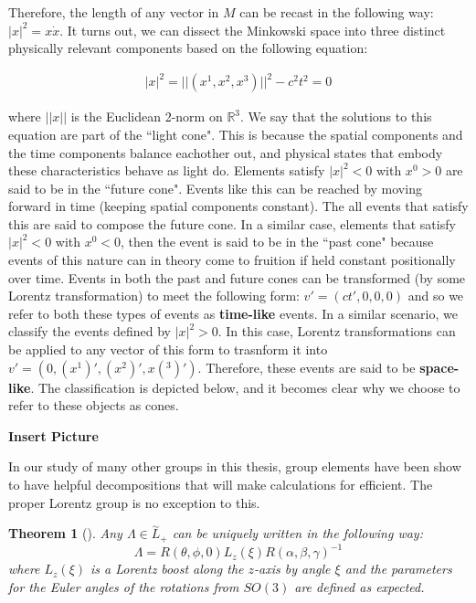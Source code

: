 \documentclass[10pt]{ucthesis}
\newcommand{\R}{\mathbb{R}}
\newtheorem{theorem}[definition]{Theorem}
\begin{document}
Therefore, the length of any vector in $M$ can be recast in the following way: $|x|^2 = x\dot x$. It turns out, we can dissect the Minkowski space into three distinct physically relevant components based on the following equation:

\begin{equation}
\begin{aligned}
	|x|^2 = ||(x^1,x^2,x^3)||^2 - c^2t^2= 0 
\end{aligned}
\end{equation}

\noindent where $||x||$ is the Euclidean 2-norm on $\R^3$. We say that the solutions to this equation are part of the ``light cone". This is because the spatial components and the time components balance eachother out, and physical states that embody these characteristics behave as light do. Elements satisfy $|x|^2 < 0$ with $x^0>0$ are said to be  in the ``future cone". Events like this can be reached by moving forward in time (keeping spatial components constant). The all events that satisfy this are said to compose the future cone. In a similar case, elements that satisfy $|x|^2 < 0$ with $x^0<0$, then the event is said to be in the ``past cone" because events of this nature can in theory come to fruition if held constant positionally over time. Events in both the past and future cones can be transformed (by some Lorentz transformation) to meet the following form: $v' = (ct',0,0,0)$ and so we refer to both these types of events as \textbf{time-like} events. In a similar scenario, we classify the events defined by $|x|^2 >0$. In this case, Lorentz transformations can be applied to any vector of this form to trasnform it into $v' = (0,(x^1)',(x^2)',x(^3)')$. Therefore, these events are said to be \textbf{space-like}. The classification is depicted below, and it becomes clear why we choose to refer to these objects as cones.

\textbf{Insert Picture}

In our study of many other groups in this thesis, group elements have been show to have helpful decompositions that will make calculations for efficient. The proper Lorentz group is no exception to this.

\begin{theorem}[\cite{Tung}]
	Any $\Lambda \in \overset{\sim}{L}_+$ can be uniquely written in the following way:
$$\Lambda = R(\theta,\phi,0)L_z(\xi)R(\alpha,\beta,\gamma)^{-1}$$
where $L_z(\xi)$ is a Lorentz boost along the $z$-axis by angle $\xi$ and the parameters for the Euler angles of the rotations from $SO(3)$ are defined as expected.
\end{theorem}
\end{document}
